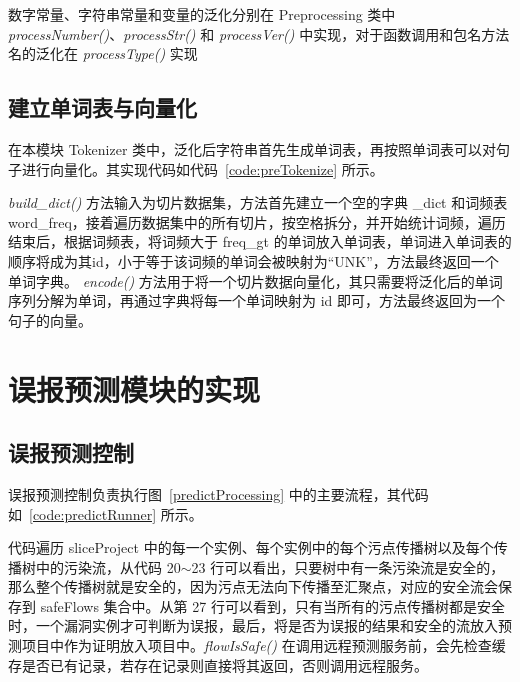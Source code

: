 数字常量、字符串常量和变量的泛化分别在 Preprocessing 类中 \textit{processNumber()}、\textit{processStr()} 和 \textit{processVer()} 中实现，对于函数调用和包名方法名的泛化在 \textit{processType()} 实现

\subsection{建立单词表与向量化}

在本模块 Tokenizer 类中，泛化后字符串首先生成单词表，再按照单词表可以对句子进行向量化。其实现代码如代码~\ref{code:preTokenize} 所示。

\begin{minipage}[!htbp]{0.9\textwidth}
    
\end{minipage}

\textit{build\_dict()} 方法输入为切片数据集，方法首先建立一个空的字典 \_dict 和词频表 word\_freq，接着遍历数据集中的所有切片，按空格拆分，并开始统计词频，遍历结束后，根据词频表，将词频大于 freq\_gt 的单词放入单词表，单词进入单词表的顺序将成为其id，小于等于该词频的单词会被映射为“UNK”，方法最终返回一个单词字典。
\textit{encode()} 方法用于将一个切片数据向量化，其只需要将泛化后的单词序列分解为单词，再通过字典将每一个单词映射为 id 即可，方法最终返回为一个句子的向量。\\

\section{误报预测模块的实现}

\subsection{误报预测控制}
误报预测控制负责执行图~\ref{predictProcessing} 中的主要流程，其代码如~\ref{code:predictRunner} 所示。

\begin{minipage}[!htbp]{0.9\textwidth}
    
\end{minipage}

代码遍历 sliceProject 中的每一个实例、每个实例中的每个污点传播树以及每个传播树中的污染流，从代码 20$\sim$23 行可以看出，只要树中有一条污染流是安全的，那么整个传播树就是安全的，因为污点无法向下传播至汇聚点，对应的安全流会保存到 safeFlows 集合中。从第 27 行可以看到，只有当所有的污点传播树都是安全时，一个漏洞实例才可判断为误报，最后，将是否为误报的结果和安全的流放入预测项目中作为证明放入项目中。\textit{flowIsSafe()} 在调用远程预测服务前，会先检查缓存是否已有记录，若存在记录则直接将其返回，否则调用远程服务。\\

